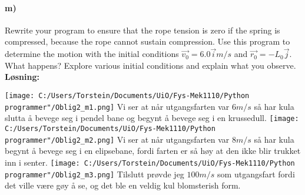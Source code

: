 \documentclass[11pt, A4paper,norsk]{article}
\begin{document}
		\paragraph{m)}
			\begin{flushleft}
Rewrite your program to ensure that the rope tension is zero if the spring is compressed, because the rope cannot sustain compression. Use this program to determine the motion with the initial conditions $\vec{v_0} = 6.0\vec{i}m/s$ and $\vec{r_0} = -L_0 \vec{j}$. What happens? Explore various initial conditions and explain what you observe. \\
\vspace{1mm}
\textbf{Løsning:} \\
\vspace{1mm}

\texttt{[image: C:/Users/Torstein/Documents/UiO/Fys-Mek1110/Python programmer"/Oblig2\_m1.png]}
Vi ser at når utgangsfarten var $6m/s$ så har kula slutta å bevege seg i pendel bane og begynt å bevege seg i en krussedull.
\texttt{[image: C:/Users/Torstein/Documents/UiO/Fys-Mek1110/Python programmer"/Oblig2\_m2.png]}
Vi ser at når utgangsfarten var $8m/s$ så har kula begynt å bevege seg i en elipsebane, fordi farten er så høy at den ikke blir trukket inn i senter.
\texttt{[image: C:/Users/Torstein/Documents/UiO/Fys-Mek1110/Python programmer"/Oblig2\_m3.png]}
Tilslutt prøvde jeg $100m/s$ som utgangsfart fordi det ville være gøy å se, og det ble en veldig kul blomsterish form.
			\end{flushleft}
\end{document}
